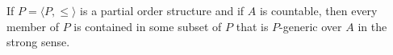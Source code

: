 If $P = \langle P, \leq \rangle$ is a partial order structure and if $A$ is countable, then every member of $P$ is contained in some subset of $P$ that is $P$-generic over $A$ in the strong sense.
